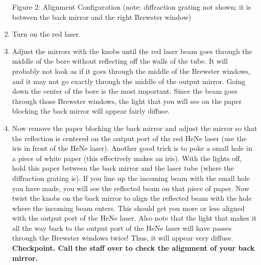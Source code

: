 \documentclass{../lab}
\begin{document}
\begin{enumerate}
Figure 2: Alignment Configuration (note: diffraction grating not shown; it is between the back mirror and the right Brewster window)






    \item Turn on the red laser.
    \item Adjust the mirrors with the knobs until the red laser beam goes through the middle of the bore without reflecting off the walls of the tube. It will probably not look as if it goes through the middle of the Brewster windows, and it may not go exactly through the middle of the output mirror. Going down the center of the bore is the most important. Since the beam goes through those Brewster windows, the light that you will see on the paper blocking the back mirror will appear fairly diffuse.
    \item Now remove the paper blocking the back mirror and adjust the mirror so that the reflection is centered on the output port of the red HeNe laser (use the iris in front of the HeNe laser). Another good trick is to poke a small hole in a piece of white paper (this effectively makes an iris). With the lights off, hold this paper between the back mirror and the laser tube (where the diffraction grating is). If you line up the incoming beam with the small hole you have made, you will see the reflected beam on that piece of paper. Now twist the knobs on the back mirror to align the reflected beam with the hole where the incoming beam enters. This should get you more or less aligned with the output port of the HeNe laser. Also note that the light that makes it all the way back to the output port of the HeNe laser will have passes through the Brewster windows twice! Thus, it will appear very diffuse.  \textbf{Checkpoint. Call the staff over to check the alignment of your back mirror.}


\end{enumerate}
\end{document}
